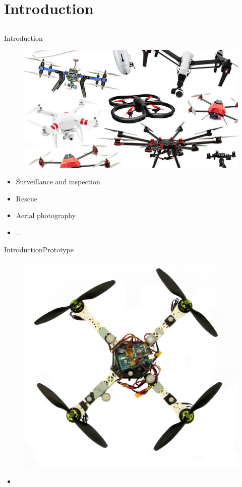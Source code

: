 \section{Introduction}

\subsection{}
\begin{frame}{Introduction}{}
    \begin{figure}[H]
        \centering
        \includegraphics[width=.6\linewidth]{figures/multicopters}
    \end{figure}
    \begin{itemize}
         \item Surveillance and inspection
         \item Rescue
         \item Aerial photography
         \item ...
    \end{itemize}

\end{frame}

\begin{frame}{Introduction}{Prototype}
    \begin{figure}[H]
        \centering
        \includegraphics[width=.45\linewidth]{figures/quadcopter}
    \end{figure}
    \begin{itemize}
        \item 
       \end{itemize}     
\end{frame}

